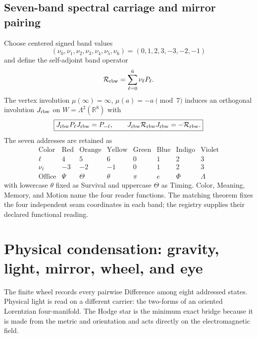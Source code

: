 \documentclass[10pt]{article}
\newcommand{\R}{\mathbb R}
\begin{document}
\subsection*{Seven-band spectral carriage and mirror pairing}
Choose centered signed band values
\begin{equation}
(\nu_0,\nu_1,\nu_2,\nu_3,\nu_4,\nu_5,\nu_6)
=(0,1,2,3,-3,-2,-1)
\end{equation}
and define the self-adjoint band operator
\begin{equation}
\mathcal R_{\rm rbw}=\sum_{\ell=0}^{6}\nu_\ell P_\ell.
\end{equation}
The vertex involution $\mu(\infty)=\infty$, $\mu(a)=-a\pmod7$ induces an orthogonal involution $J_{\rm rbw}$ on $W=\Lambda^2(\R^8)$ with
\begin{equation}
\boxed{J_{\rm rbw}P_\ell J_{\rm rbw}=P_{-\ell},\qquad
J_{\rm rbw}\mathcal R_{\rm rbw}J_{\rm rbw}=-\mathcal R_{\rm rbw}.}
\end{equation}
The seven addresses are retained as
\begin{equation}
\begin{array}{c|ccccccc}
\text{Color}&\text{Red}&\text{Orange}&\text{Yellow}&\text{Green}&\text{Blue}&\text{Indigo}&\text{Violet}\\
\ell&4&5&6&0&1&2&3\\
\nu_\ell&-3&-2&-1&0&1&2&3\\
\text{Office}&\Psi&\Theta&\theta&\pi&e&\Phi&\Lambda
\end{array}
\end{equation}
with lowercase $\theta$ fixed as Survival and uppercase $\Theta$ as Timing. Color, Meaning, Memory, and Motion name the four reader functions. The matching theorem fixes the four independent seam coordinates in each band; the registry supplies their declared functional reading.

\section{Physical condensation: gravity, light, mirror, wheel, and eye}
\label{sec:physicalmap}
The finite wheel records every pairwise Difference among eight addressed
states. Physical light is read on a different carrier: the two-forms of an
oriented Lorentzian four-manifold. The Hodge star is the minimum exact bridge
because it is made from the metric and orientation and acts directly on the
electromagnetic field.
\end{document}
